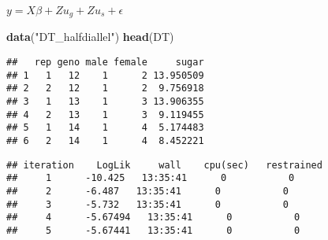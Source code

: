\documentclass[]{article}
\newenvironment{Shaded}{\begin{snugshade}}{\end{snugshade}}
\newcommand{\KeywordTok}[1]{\textcolor[rgb]{0.13,0.29,0.53}{\textbf{#1}}}
\newcommand{\DataTypeTok}[1]{\textcolor[rgb]{0.13,0.29,0.53}{#1}}
\newcommand{\DecValTok}[1]{\textcolor[rgb]{0.00,0.00,0.81}{#1}}
\newcommand{\StringTok}[1]{\textcolor[rgb]{0.31,0.60,0.02}{#1}}
\newcommand{\OperatorTok}[1]{\textcolor[rgb]{0.81,0.36,0.00}{\textbf{#1}}}
\newcommand{\NormalTok}[1]{#1}
\begin{document}
\(y = X\beta + Zu_g + Zu_s + \epsilon\)

\begin{Shaded}
\begin{Highlighting}[]
\KeywordTok{data}\NormalTok{(}\StringTok{"DT_halfdiallel"}\NormalTok{)}
\KeywordTok{head}\NormalTok{(DT)}
\end{Highlighting}
\end{Shaded}

\begin{verbatim}
##   rep geno male female     sugar
## 1   1   12    1      2 13.950509
## 2   2   12    1      2  9.756918
## 3   1   13    1      3 13.906355
## 4   2   13    1      3  9.119455
## 5   1   14    1      4  5.174483
## 6   2   14    1      4  8.452221
\end{verbatim}

\begin{Shaded}
\end{Shaded}

\begin{verbatim}
## iteration    LogLik     wall    cpu(sec)   restrained
##     1      -10.425   13:35:41      0           0
##     2      -6.487   13:35:41      0           0
##     3      -5.732   13:35:41      0           0
##     4      -5.67494   13:35:41      0           0
##     5      -5.67441   13:35:41      0           0
\end{verbatim}

\begin{Shaded}
\end{Shaded}
\end{document}
